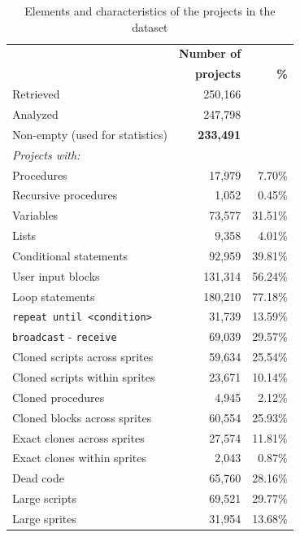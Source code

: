 \documentclass{sig-alternate-05-2015}
\begin{document}
\begin{table}[ht]
	\centering
	\begin{tabular}{lrr}
		\hline
		&\textbf{Number of}&\\
		&\textbf{projects}& \textbf{\%}\\
		\hline
		Retrieved & 250,166 & \\
		Analyzed & 247,798 & \\
		Non-empty (used for statistics) & \textbf{233,491} & \\
		\hline
		\textit{Projects with:} & & \\

		Procedures & 17,979 & 7.70\%\\
		Recursive procedures &  1,052 & 0.45\%\\
		Variables & 73,577 & 31.51\% \\
		Lists & 9,358 & 4.01\% \\
		Conditional statements & 92,959 & 39.81\% \\
		User input blocks& 131,314 & 56.24\% \\
		Loop statements & 180,210 & 77.18\% \\
		\texttt{repeat until <condition>} & 31,739 & 13.59\% \\
		\texttt{broadcast} - \texttt{receive} & 69,039 & 29.57\%\\
		Cloned scripts across sprites & 59,634 & 25.54\% \\
		Cloned scripts within sprites & 23,671 & 10.14\%\\
		Cloned procedures & 4,945 & 2.12\%\\
		Cloned blocks across sprites & 60,554 & 25.93\%\\
		Exact clones across sprites & 27,574 & 11.81\%\\
		Exact clones within sprites & 2,043 & 0.87\%\\
		Dead code & 65,760 & 28.16\%\\
		Large scripts & 69,521 & 29.77\%\\
		Large sprites & 31,954 & 13.68\%\\		
		\hline
	\end{tabular}
	\caption{Elements and characteristics of the projects in the dataset}
	\label{tbl-characteristics}
\end{table}
\end{document}
